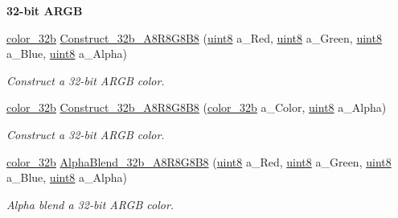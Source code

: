 \begin{Indent}{\bf 32-\/bit ARGB}\par
\begin{DoxyCompactItemize}
\item 
\hyperlink{namespacetil_a8eb2d871b8a6ffb55b3eeb720207a6cb}{color\_\-32b} \hyperlink{namespacetil_a9dc7ee813858f38308e7d38df21b0953}{Construct\_\-32b\_\-A8R8G8B8} (\hyperlink{namespacetil_a7a75b0e7e2cd3f19ea51c8c02fd242f8}{uint8} a\_\-Red, \hyperlink{namespacetil_a7a75b0e7e2cd3f19ea51c8c02fd242f8}{uint8} a\_\-Green, \hyperlink{namespacetil_a7a75b0e7e2cd3f19ea51c8c02fd242f8}{uint8} a\_\-Blue, \hyperlink{namespacetil_a7a75b0e7e2cd3f19ea51c8c02fd242f8}{uint8} a\_\-Alpha)
\begin{DoxyCompactList}\small\item\em Construct a 32-\/bit ARGB color. \item\end{DoxyCompactList}\item 
\hyperlink{namespacetil_a8eb2d871b8a6ffb55b3eeb720207a6cb}{color\_\-32b} \hyperlink{namespacetil_a269385b5e84783f03c13fc7a590b6a44}{Construct\_\-32b\_\-A8R8G8B8} (\hyperlink{namespacetil_a8eb2d871b8a6ffb55b3eeb720207a6cb}{color\_\-32b} a\_\-Color, \hyperlink{namespacetil_a7a75b0e7e2cd3f19ea51c8c02fd242f8}{uint8} a\_\-Alpha)
\begin{DoxyCompactList}\small\item\em Construct a 32-\/bit ARGB color. \item\end{DoxyCompactList}\item 
\hyperlink{namespacetil_a8eb2d871b8a6ffb55b3eeb720207a6cb}{color\_\-32b} \hyperlink{namespacetil_a1b2bc733875b4132b63390b24c3ccae1}{AlphaBlend\_\-32b\_\-A8R8G8B8} (\hyperlink{namespacetil_a7a75b0e7e2cd3f19ea51c8c02fd242f8}{uint8} a\_\-Red, \hyperlink{namespacetil_a7a75b0e7e2cd3f19ea51c8c02fd242f8}{uint8} a\_\-Green, \hyperlink{namespacetil_a7a75b0e7e2cd3f19ea51c8c02fd242f8}{uint8} a\_\-Blue, \hyperlink{namespacetil_a7a75b0e7e2cd3f19ea51c8c02fd242f8}{uint8} a\_\-Alpha)
\begin{DoxyCompactList}\small\item\em Alpha blend a 32-\/bit ARGB color. \item\end{DoxyCompactList}\end{DoxyCompactItemize}
\end{Indent}
